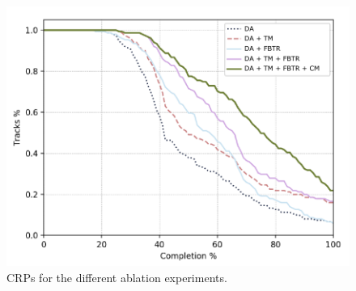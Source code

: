 \begin{figure}[t]
    \centering
    \includegraphics[width=\linewidth]{images/all_ablation_completion_results.pdf}
    \caption{CRPs for the different ablation experiments.}
    \label{fig:ablation_CRP}
\end{figure}

